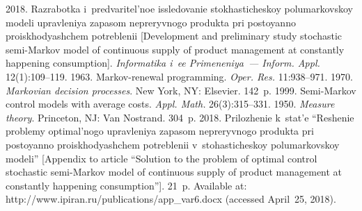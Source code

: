   


 


\vspace*{-6pt}

  \begin{multicols}{2}

\renewcommand{\bibname}{\protect\rmfamily References}

{\small\frenchspacing
 {\baselineskip=10.4pt
 \begin{thebibliography}{99}
   2018. Raz\-ra\-bot\-ka i~predvaritel'noe 
issledovanie stokhasticheskoy polumarkovskoy modeli upravleniya zapasom 
ne\-pre\-ryv\-no\-go pro\-duk\-ta pri po\-sto\-yan\-no pro\-is\-kho\-dya\-shchem 
po\-treb\-le\-nii [Development 
and preliminary study stochastic semi-Markov model of continuous supply of product 
management at constantly happening consumption]. \textit{Informatika i~ee 
Primeneniya~--- Inform. Appl.} 12(1):109--119.
   1963. Markov-renewal programming. \textit{Oper. Res.} 
11:938--971.
   1970. \textit{Markovian decision 
processes}. New York, NY: Elsevier. 142~p.
   1999. Semi-Markov control 
models with average costs. \textit{Appl. Math.} 26(3):315--331.
   1950. \textit{Measure theory}. Princeton, NJ: Van Nostrand.  
304~p.
   2018. Pri\-lo\-zhe\-nie k~stat'e 
  ``Re\-she\-nie 
prob\-le\-my op\-ti\-mal'\-no\-go uprav\-le\-niya za\-pa\-som ne\-pre\-ryv\-no\-go 
pro\-duk\-ta pri po\-sto\-yan\-no 
pro\-is\-kho\-dya\-shchem po\-treb\-le\-nii v~sto\-ha\-sti\-che\-skoy 
po\-lu\-mar\-kov\-skoy mo\-de\-li'' 
[Appendix to article ``Solution to the problem of optimal control stochastic  
semi-Markov model of continuous supply of product management at constantly 
happening consumption'']. 21~p. Available at: {\sf 
http://www.ipiran.ru/publications/app\_var6.docx} (accessed April~25, 2018).

\end{thebibliography}}}
\end{multicols}
